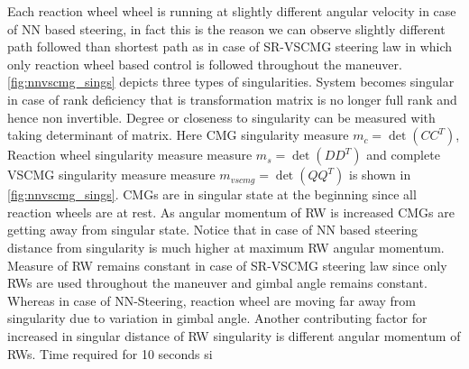 \noindent Each reaction wheel wheel is running at slightly different angular velocity in case of NN based steering, in fact this is the reason we can observe slightly different path followed than shortest path as in case of SR-VSCMG steering law in which only reaction wheel based control is followed throughout the maneuver. \autoref{fig:nnvscmg_sings} depicts three types of singularities. System becomes singular in case of rank deficiency that is transformation matrix is no longer full rank and hence non invertible. Degree or closeness to singularity can be measured with taking determinant of matrix. Here CMG singularity measure $m_c = \det(CC^T)$, Reaction wheel singularity measure measure $m_s = \det(DD^T)$ and complete VSCMG singularity measure measure $m_{vscmg} = \det(QQ^T)$ is shown in \autoref{fig:nnvscmg_sings}. CMGs are in singular state at the beginning since all reaction wheels are at rest. As angular momentum of RW is increased CMGs are getting away from singular state. Notice that in case of NN based steering distance from singularity is much higher at maximum RW angular momentum. Measure of RW remains constant in case of SR-VSCMG steering law since only RWs are used throughout the maneuver and gimbal angle remains constant. Whereas in case of NN-Steering, reaction wheel are moving far away from singularity due to variation in gimbal angle. Another contributing factor for increased in singular distance of RW singularity is different angular momentum of RWs. Time required for 10 seconds si

